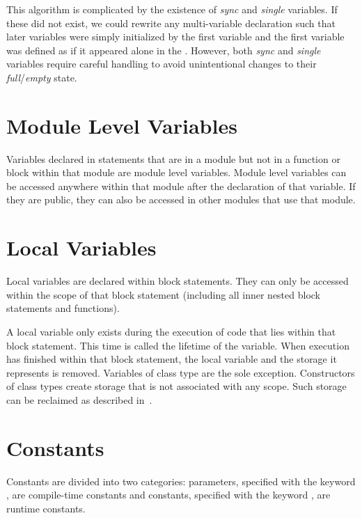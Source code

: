 \begin{rationale}
This algorithm is complicated by the existence of \emph{sync}
and \emph{single} variables.  If these did not exist, we could rewrite
any multi-variable declaration such that later variables were simply
initialized by the first variable and the first variable was defined
as if it appeared alone in the .  However,
both \emph{sync} and \emph{single} variables require careful handling
to avoid unintentional changes to their \emph{full}/\emph{empty}
state.
\end{rationale}

\section{Module Level Variables}
\label{Module_Level_Variables}

Variables declared in statements that are in a module but not in a
function or block within that module are module level variables.
Module level variables can be accessed anywhere within that module
after the declaration of that variable.  If they are public, they can
also be accessed in other modules that use that module.

\section{Local Variables}
\label{Local_Variables}

Local variables are declared within block statements.  They can only
be accessed within the scope of that block statement (including all
inner nested block statements and functions).

A local variable only exists during the execution of code that lies
within that block statement.  This time is called the lifetime of the
variable.  When execution has finished within that block statement,
the local variable and the storage it represents is removed.
Variables of class type are the sole exception.  Constructors of class
types create storage that is not associated with any scope.  Such
storage can be reclaimed as described
in~.

\section{Constants}
\label{Constants}

Constants are divided into two categories: parameters, specified with
the keyword , are compile-time constants and constants,
specified with the keyword , are runtime constants.

